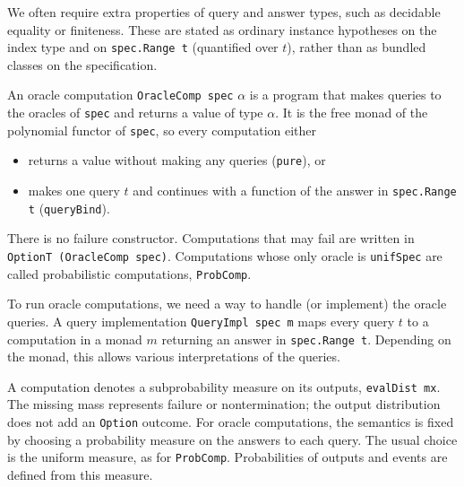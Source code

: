 We often require extra properties of query and answer types, such as decidable equality or
finiteness. These are stated as ordinary instance hypotheses on the index type and on
\verb|spec.Range t| (quantified over $t$), rather than as bundled classes on the specification.

\begin{definition}
    \label{def:oracle_computation}
    An oracle computation \verb|OracleComp spec| $\alpha$ is a program that makes queries to the oracles of
    \verb|spec| and returns a value of type $\alpha$. It is the free monad of the polynomial functor
    of \verb|spec|, so every computation either
    \begin{itemize}
        \item returns a value without making any queries (\verb|pure|), or
        \item makes one query $t$ and continues with a function of the answer in \verb|spec.Range t|
        (\verb|queryBind|).
    \end{itemize}
    There is no failure constructor. Computations that may fail are written in
    \verb|OptionT (OracleComp spec)|. Computations whose only oracle is \verb|unifSpec| are called
    probabilistic computations, \verb|ProbComp|.
    \leanok
\end{definition}

\begin{definition}
    \label{def:handling_oracle_queries}
    To run oracle computations, we need a way to handle (or implement) the oracle queries.
    A query implementation \verb|QueryImpl spec m| maps every query $t$ to a computation in a monad
    $m$ returning an answer in \verb|spec.Range t|. Depending on the monad, this allows various
    interpretations of the queries.
    \leanok
\end{definition}

\begin{definition}
    \label{def:probabilistic_semantics_of_oracle_computations}
    A computation denotes a subprobability measure on its outputs, \verb|evalDist mx|. The missing
    mass represents failure or nontermination; the output distribution does not add an
    \verb|Option| outcome. For oracle computations, the semantics is fixed by choosing a probability
    measure on the answers to each query. The usual choice is the uniform measure, as for
    \verb|ProbComp|. Probabilities of outputs and events are defined from this measure.
    \leanok
\end{definition}


